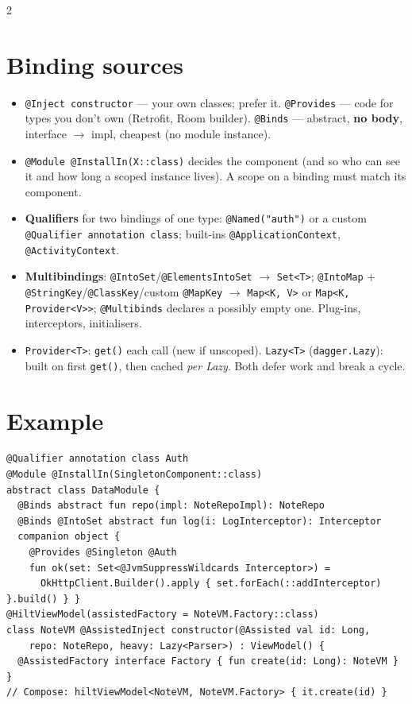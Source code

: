 \documentclass[8pt]{extarticle}
\begin{document}
\begin{multicols}{2}
\raggedright

\section{Binding sources}
\begin{itemize}\raggedright
  \item \texttt{@Inject constructor} — your own classes; prefer it. \texttt{@Provides} — code
        for types you don't own (Retrofit, Room builder). \texttt{@Binds} — abstract,
        \textbf{no body}, interface $\to$ impl, cheapest (no module instance).
  \item \texttt{@Module @InstallIn(X::class)} decides the component (and so who can see it and how
        long a scoped instance lives). A scope on a binding must match its component.
  \item \textbf{Qualifiers} for two bindings of one type: \texttt{@Named("auth")} or a custom
        \texttt{@Qualifier annotation class}; built-ins \texttt{@ApplicationContext},
        \texttt{@ActivityContext}.
  \item \textbf{Multibindings}: \texttt{@IntoSet}/\texttt{@ElementsIntoSet} $\to$
        \texttt{Set<T>}; \texttt{@IntoMap} + \texttt{@StringKey}/\texttt{@ClassKey}/custom
        \texttt{@MapKey} $\to$ \texttt{Map<K, V>} or \texttt{Map<K, Provider<V>{}>};
        \texttt{@Multibinds} declares a possibly empty one. Plug-ins, interceptors, initialisers.
  \item \texttt{Provider<T>}: \texttt{get()} each call (new if unscoped). \texttt{Lazy<T>}
        (\texttt{dagger.Lazy}): built on first \texttt{get()}, then cached \emph{per Lazy}. Both
        defer work and break a cycle.
\end{itemize}

\section{Example}
\begin{lstlisting}[language=KotlinSheet]
@Qualifier annotation class Auth
@Module @InstallIn(SingletonComponent::class)
abstract class DataModule {
  @Binds abstract fun repo(impl: NoteRepoImpl): NoteRepo
  @Binds @IntoSet abstract fun log(i: LogInterceptor): Interceptor
  companion object {
    @Provides @Singleton @Auth
    fun ok(set: Set<@JvmSuppressWildcards Interceptor>) =
      OkHttpClient.Builder().apply { set.forEach(::addInterceptor) }.build() } }
@HiltViewModel(assistedFactory = NoteVM.Factory::class)
class NoteVM @AssistedInject constructor(@Assisted val id: Long,
    repo: NoteRepo, heavy: Lazy<Parser>) : ViewModel() {
  @AssistedFactory interface Factory { fun create(id: Long): NoteVM } }
// Compose: hiltViewModel<NoteVM, NoteVM.Factory> { it.create(id) }
\end{lstlisting}


\end{multicols}
\end{document}

